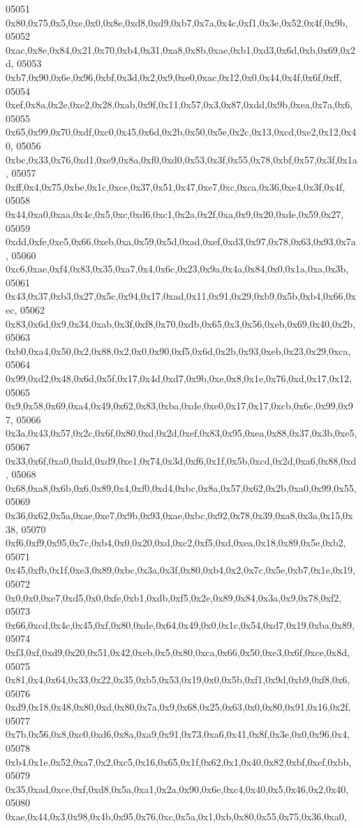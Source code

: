 \begin{DoxyCode}
05051   0x80,0x75,0x5,0xe,0x0,0x8e,0xd8,0xd9,0xb7,0x7a,0x4c,0xf1,0x3e,0x52,0x4f,0x9b,
05052   0xac,0x8e,0x84,0x21,0x70,0xb4,0x31,0xa8,0x8b,0xae,0xb1,0xd3,0x6d,0xb,0x69,0x2d,
05053   0xb7,0x90,0x6e,0x96,0xbf,0x3d,0x2,0x9,0xe0,0xac,0x12,0x0,0x44,0x4f,0x6f,0xff,
05054   0xef,0x8a,0x2e,0xe2,0x28,0xab,0x9f,0x11,0x57,0x3,0x87,0xdd,0x9b,0xea,0x7a,0x6,
05055   0x65,0x99,0x70,0xdf,0xc0,0x45,0x6d,0x2b,0x50,0x5e,0x2c,0x13,0xcd,0xe2,0x12,0x40,
05056   0xbc,0x33,0x76,0xd1,0xe9,0x8a,0xf0,0xd0,0x53,0x3f,0x55,0x78,0xbf,0x57,0x3f,0x1a,
05057   0xff,0x4,0x75,0xbe,0x1c,0xce,0x37,0x51,0x47,0xe7,0xc,0xca,0x36,0xe4,0x3f,0x4f,
05058   0x44,0xa0,0xaa,0x4c,0x5,0xc,0xd6,0xc1,0x2a,0x2f,0xa,0x9,0x20,0xde,0x59,0x27,
05059   0xdd,0xfe,0xe5,0x66,0xeb,0xa,0x59,0x5d,0xad,0xef,0xd3,0x97,0x78,0x63,0x93,0x7a,
05060   0xc6,0xae,0xf4,0x83,0x35,0xa7,0x4,0x6c,0x23,0x9a,0x4a,0x84,0x0,0x1a,0xa,0x3b,
05061   0x43,0x37,0xb3,0x27,0x5c,0x94,0x17,0xad,0x11,0x91,0x29,0xb9,0x5b,0xb4,0x66,0xec,
05062   0x83,0x6d,0x9,0x34,0xab,0x3f,0xf8,0x70,0xdb,0x65,0x3,0x56,0xeb,0x69,0x40,0x2b,
05063   0xb0,0xa4,0x50,0x2,0x88,0x2,0x0,0x90,0xf5,0x6d,0x2b,0x93,0xeb,0x23,0x29,0xca,
05064   0x99,0xd2,0x48,0x6d,0x5f,0x17,0x4d,0xd7,0x9b,0xe,0x8,0x1e,0x76,0xd,0x17,0x12,
05065   0x9,0x58,0x69,0xa4,0x49,0x62,0x83,0xba,0xde,0xe0,0x17,0x17,0xcb,0x6c,0x99,0x97,
05066   0x3a,0x43,0x57,0x2c,0x6f,0x80,0xd,0x2d,0xef,0x83,0x95,0xea,0x88,0x37,0x3b,0xe5,
05067   0x33,0x6f,0xa0,0xdd,0xd9,0xe1,0x74,0x3d,0xf6,0x1f,0x5b,0xcd,0x2d,0xa6,0x88,0xd,
05068   0x68,0xa8,0x6b,0x6,0x89,0x4,0xf0,0xd4,0xbc,0x8a,0x57,0x62,0x2b,0xa0,0x99,0x55,
05069   0x36,0x62,0x5a,0xae,0xe7,0x9b,0x93,0xae,0xbc,0x92,0x78,0x39,0xa8,0x3a,0x15,0x38,
05070   0xf6,0xf9,0x95,0x7c,0xb4,0x0,0x20,0xd,0xc2,0xf5,0xd,0xea,0x18,0x89,0x5e,0xb2,
05071   0x45,0xfb,0x1f,0xe3,0x89,0xbc,0x3a,0x3f,0x80,0xb4,0x2,0x7c,0x5e,0xb7,0x1e,0x19,
05072   0x0,0x0,0xe7,0xd5,0x0,0xfe,0xb1,0xdb,0xf5,0x2e,0x89,0x84,0x3a,0x9,0x78,0xf2,
05073   0x66,0xcd,0x4c,0x45,0xf,0x80,0xde,0x64,0x49,0x0,0x1c,0x54,0xd7,0x19,0xba,0x89,
05074   0xf3,0xf,0xd9,0x20,0x51,0x42,0xeb,0x5,0x80,0xca,0x66,0x50,0xe3,0x6f,0xce,0x8d,
05075   0x81,0x4,0x64,0x33,0x22,0x35,0xb5,0x53,0x19,0x0,0x5b,0xf1,0x9d,0xb9,0xf8,0x6,
05076   0xd9,0x18,0x48,0x80,0xd,0x80,0x7a,0x9,0x68,0x25,0x63,0x0,0x80,0x91,0x16,0x2f,
05077   0x7b,0x56,0x8,0xc0,0xd6,0x8a,0xa9,0x91,0x73,0xa6,0x41,0x8f,0x3e,0x0,0x96,0x4,
05078   0xb4,0x1e,0x52,0xa7,0x2,0xc5,0x16,0x65,0x1f,0x62,0x1,0x40,0x82,0xbf,0xef,0xbb,
05079   0x35,0xad,0xce,0xf,0xd8,0x5a,0xa1,0x2a,0x90,0x6e,0xc4,0x40,0x5,0x46,0x2,0x40,
05080   0xae,0x44,0x3,0x98,0x4b,0x95,0x76,0xc,0x5a,0x1,0xb,0x80,0x55,0x75,0x36,0xa0,

\end{DoxyCode}
